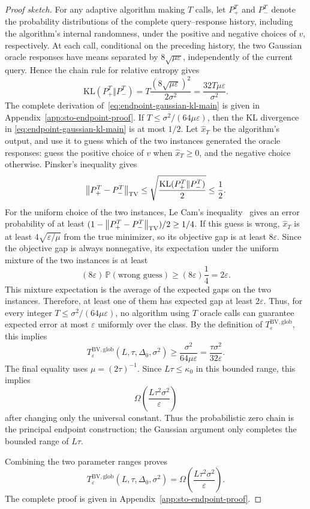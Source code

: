 \documentclass[11pt]{article}
\newcommand{\Pbb}{\mathbb{P}}
\newcommand{\norm}[1]{\left\lVert #1\right\rVert}
\begin{document}
\begin{proof}[Proof sketch]
For any adaptive algorithm making $T$ calls, let $P_+^T$ and $P_-^T$ denote the probability distributions of the
complete query--response history, including the algorithm's internal randomness, under the positive and negative
choices of $v$, respectively. At each call, conditional on the preceding history, the two Gaussian oracle responses
have means separated by $8\sqrt{\mu\varepsilon}$, independently of the current query. Hence the chain rule for
relative entropy gives
\begin{equation}
\label{eq:endpoint-gaussian-kl-main}
\mathrm{KL}(P_+^T\Vert P_-^T)
=
T\frac{(8\sqrt{\mu\varepsilon})^2}{2\sigma^2}
=
\frac{32T\mu\varepsilon}{\sigma^2}.
\end{equation}
The complete derivation of~\eqref{eq:endpoint-gaussian-kl-main}
is given in Appendix~\ref{app:sto-endpoint-proof}.
If $T\le\sigma^2/(64\mu\varepsilon)$, then the KL divergence in
\eqref{eq:endpoint-gaussian-kl-main} is at most $1/2$. Let $\widehat x_T$ be the algorithm's output, and use it to
guess which of the two instances generated the oracle responses: guess the positive choice of $v$ when
$\widehat x_T\ge0$, and the negative choice otherwise. Pinsker's inequality gives
\[
\norm{P_+^T-P_-^T}_{\rm TV}
\le
\sqrt{\frac{\mathrm{KL}(P_+^T\Vert P_-^T)}{2}}
\le \frac12.
\]
For the uniform choice of the two instances, Le Cam's inequality~\citep{Yu1997} gives an error probability of at least
$(1-\norm{P_+^T-P_-^T}_{\rm TV})/2\ge1/4$. If this guess is wrong, $\widehat x_T$ is at least
$4\sqrt{\varepsilon/\mu}$ from the true minimizer, so its objective gap is at least $8\varepsilon$. Since the
objective gap is always nonnegative, its expectation under the uniform mixture of the two instances is at least
\[
(8\varepsilon)\,\Pbb(\text{wrong guess})
\ge
(8\varepsilon)\frac14
=2\varepsilon.
\]
This mixture expectation is the average of the expected gaps on the two instances. Therefore, at least one of them has
expected gap at least $2\varepsilon$. Thus, for every integer
$T\le\sigma^2/(64\mu\varepsilon)$, no algorithm using $T$ oracle calls can guarantee expected error at most
$\varepsilon$ uniformly over the class. By the definition of
$T_\varepsilon^{\mathrm{BV,glob}}$, this implies
\[
T_\varepsilon^{\mathrm{BV,glob}}(L,\tau,\Delta_0,\sigma^2)
\ge
\frac{\sigma^2}{64\mu\varepsilon}
=
\frac{\tau\sigma^2}{32\varepsilon}.
\]
The final equality uses $\mu=(2\tau)^{-1}$.
Since \(L\tau\le\kappa_0\) in this bounded range, this implies
\[
\Omega\left(\frac{L\tau^2\sigma^2}{\varepsilon}\right)
\]
after changing only the universal constant. Thus the probabilistic zero chain is the principal endpoint construction;
the Gaussian argument only completes the bounded range of \(L\tau\).

Combining the two parameter ranges proves
\[
T_\varepsilon^{\mathrm{BV,glob}}(L,\tau,\Delta_0,\sigma^2)
=
\Omega\left(\frac{L\tau^2\sigma^2}{\varepsilon}\right).
\]
The complete proof is given in Appendix~\ref{app:sto-endpoint-proof}.
\end{proof}
\end{document}
